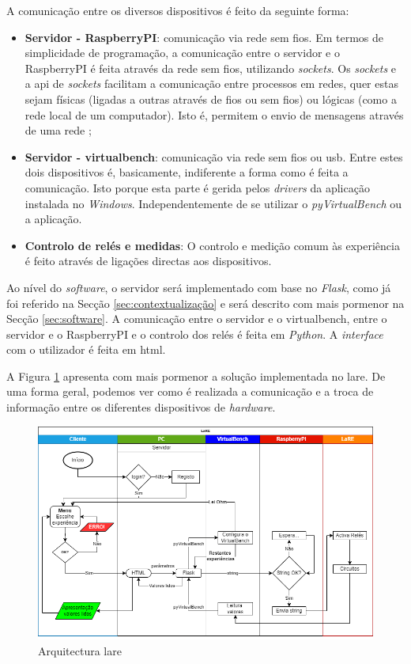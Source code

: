A comunicação entre os diversos dispositivos é feito da seguinte forma:
\begin{itemize}
    \item \textbf{Servidor - \gls{RaspberryPI}}: comunicação via rede sem fios. Em termos de simplicidade de programação, a comunicação entre o servidor e o \gls{RaspberryPI} é feita através da rede sem fios, utilizando \textit{sockets}. Os \textit{sockets} e a \acrshort{api} de \textit{sockets} facilitam a comunicação entre processos em redes, quer estas sejam físicas (ligadas a outras através de fios ou sem fios) ou lógicas (como a rede local de um computador). Isto é, permitem o envio de mensagens através de uma rede \cite{Sockets};
    \item \textbf{Servidor - \acrshort{virtualbench}}: comunicação via rede sem fios ou \acrshort{usb}. Entre estes dois dispositivos é, basicamente, indiferente a forma como é feita a comunicação. Isto porque esta parte é gerida pelos \textit{drivers} da aplicação instalada no \textit{Windows}. Independentemente de se utilizar o \textit{pyVirtualBench} ou a aplicação.
    \item \textbf{Controlo de relés e medidas}: O controlo e medição comum às experiência é feito através de ligações directas aos dispositivos.
\end{itemize}

Ao nível do \textit{software}, o servidor será implementado com base no \textit{Flask}, como já foi referido na Secção \ref{sec:contextualização} e será descrito com mais pormenor na Secção \ref{sec:software}. A comunicação entre o servidor e o \acrshort{virtualbench}, entre o servidor e o \gls{RaspberryPI} e o controlo dos relés é feita em \textit{Python}. A \textit{interface} com o utilizador é feita em \acrshort{html}.

A Figura {\ref{fig:arquitecturalore}} apresenta com mais pormenor a solução implementada no \acrshort{lare}. De uma forma geral, podemos ver como é realizada a comunicação e a troca de informação entre os diferentes dispositivos de \textit{hardware}.

\begin{figure}[hbtp]
    \centering
    \includegraphics[width=1\textwidth]{figures/Diagrama_SOFTWARE.drawio.png}
    \caption{Arquitectura \acrshort{lare}}
    \label{fig:arquitecturalore}
\end{figure}


